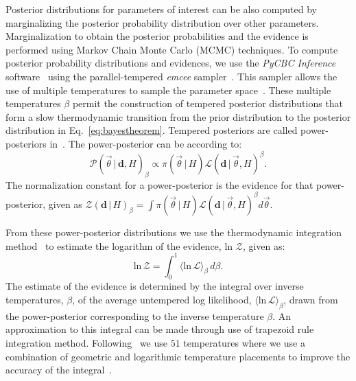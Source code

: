 Posterior distributions for parameters of interest can be also computed by marginalizing the posterior probability distribution over other parameters.  Marginalization to obtain the posterior probabilities and the evidence is performed using Markov Chain Monte Carlo (MCMC) techniques. To compute posterior probability distributions and evidences, we use the \emph{PyCBC Inference} software~\citep{alex_nitz_2018_1208115,biwer2019pycbc} using the parallel-tempered \emph{emcee} sampler~\citep{emcee,vousden:2016}.
This sampler allows the use of multiple temperatures to sample the parameter space~\citep{emcee, doi:10.1143/PTPS.157.317, B509983H}. These multiple temperatures $\beta$ permit the construction of tempered posterior distributions that form a slow thermodynamic transition from the prior distribution to the posterior distribution in Eq.~\ref{eq:bayestheorem}. Tempered posteriors are called power-posteriors in~\cite{lartillot2006computing, friel2008marginal}. The power-posterior can be according to:
\begin{equation}
    \mathcal{P}(\vec{\theta} \, | \,\mathbf{d}, H)_\beta \propto \pi(\vec{\theta} \, | \, H) \mathcal{L}(\mathbf{d} \, | \, \vec{\theta}, H)^\beta.
\end{equation}\label{eq:power_posterior}
The normalization constant for a power-posterior is the evidence for that power-posterior, given as $\mathcal{Z}(\mathbf{d} \, | \, H)_\beta = \int \pi\left(\vec{\theta} \, | \, H\right) \mathcal{L}(\mathbf{d} \, | \, \vec{\theta}, H)^\beta d\vec{\theta}$.

From these power-posterior distributions we use the thermodynamic integration method~\citep{lartillot2006computing,friel2008marginal} to estimate the logarithm of the evidence, ln $\mathcal{Z}$, given as:
\begin{equation}
\textrm{ln} \, \mathcal{Z} = \int_0^1 \langle \textrm{ln} \, \mathcal{L} \rangle_{\beta} \, d\beta.
\label{eqn:thermodyn_int}
\end{equation}
The estimate of the evidence is determined by the integral over inverse temperatures, $\beta$, of the average untempered log likelihood, $\langle \textrm{ln}\, \mathcal{L} \rangle_{\beta}$, drawn from the power-posterior corresponding to the inverse temperature $\beta$. An approximation to this integral can be made through use of trapezoid rule integration method. Following~\cite{de2018tidal} we use $51$ temperatures where we use a combination of geometric and logarithmic temperature placements to improve the accuracy of the integral~\citep{liu2016evaluating}.

